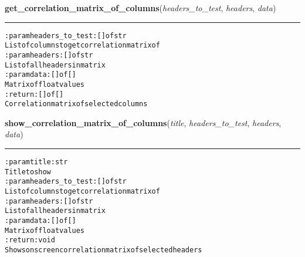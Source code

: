     \label{hal:ml:analysis:correlation:get_correlation_matrix_of_columns}

    \vspace{0.5ex}

\hspace{.8\funcindent}\begin{boxedminipage}{\funcwidth}

    \raggedright \textbf{get\_correlation\_matrix\_of\_columns}(\textit{headers\_to\_test}, \textit{headers}, \textit{data})

    \vspace{-1.5ex}

    \rule{\textwidth}{0.5\fboxrule}
\setlength{\parskip}{2ex}
\begin{alltt}

:param headers\_to\_test: [] of str
    List of columns to get correlation matrix of
:param headers: [] of str
    List of all headers in matrix
:param data: [] of []
    Matrix of float values
:return: [] of []
    Correlation matrix of selected columns
\end{alltt}

\setlength{\parskip}{1ex}
    \end{boxedminipage}

    \label{hal:ml:analysis:correlation:show_correlation_matrix_of_columns}

    \vspace{0.5ex}

\hspace{.8\funcindent}\begin{boxedminipage}{\funcwidth}

    \raggedright \textbf{show\_correlation\_matrix\_of\_columns}(\textit{title}, \textit{headers\_to\_test}, \textit{headers}, \textit{data})

    \vspace{-1.5ex}

    \rule{\textwidth}{0.5\fboxrule}
\setlength{\parskip}{2ex}
\begin{alltt}

:param title: str
    Title to show
:param headers\_to\_test: [] of str
    List of columns to get correlation matrix of
:param headers: [] of str
    List of all headers in matrix
:param data: [] of []
    Matrix of float values
:return: void
    Shows on screen correlation matrix of selected headers
\end{alltt}

\setlength{\parskip}{1ex}
    \end{boxedminipage}

